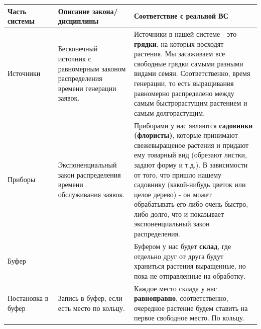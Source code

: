 \documentclass[a4paper, 14pt]{article}
\begin{document}
\begin{center}
	\begin{tabular}{|p{0.2\linewidth} | p{0.3\linewidth}| p{0.5\linewidth}|}
		\hline
		Часть системы      & Описание закона/дисциплины                                                           & Соответствие с реальной ВС                                                                                                                                                                                                                                                                                                                                                       \\
		\hline
		Источники          & Бесконечный источник с равномерным законом распределения времени генерации заявок.   & Источники в нашей системе - это \textbf{грядки}, на которых восходят растения. Мы засаживаем все свободные грядки самыми разными видами семян. Соответственно, время генерации, то есть выращивания равномерно распределено между самым быстрорастущим растением и самым долгорастущим.                                                                                          \\
		\hline
		Приборы            & Экспоненциальный закон распределения времени обслуживания заявок.                    & Приборами у нас являются \textbf{садовники (флористы)}, которые принимают свежевыращеное растения и придают ему товарный вид (обрезают листки, задают форму и т.д.). В зависимости от того, что пришло нашему садовнику (какой-нибудь цветок или целое дерево) - он может обрабатывать его либо очень быстро, либо долго, что и показывает экспоненциальный закон распределения. \\
		\hline
		Буфер              &                                                                                      & Буфером у нас будет \textbf{склад}, где отдельно друг от друга будут храниться растения выращенные, но пока не отправленные на обработку.                                                                                                                                                                                                                                        \\
		\hline
		Постановка в буфер & Запись в буфер, если есть место по кольцу.                                           & Каждое место склада у нас \textbf{равноправно}, соответственно, очередное растение будем ставить на первое свободное место. По кольцу.                                                                                                                                                                                                                                           \\

\end{tabular}
\end{center}
\end{document}
